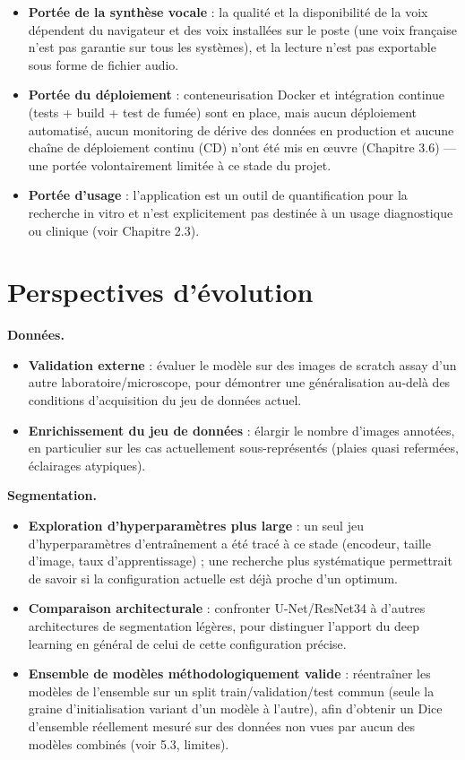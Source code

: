\documentclass[12pt,a4paper]{report}
\begin{document}
\begin{itemize}
\item \textbf{Portée de la synthèse vocale} : la qualité et la disponibilité de la voix dépendent du navigateur et des voix installées sur le poste (une voix française n'est pas garantie sur tous les systèmes), et la lecture n'est pas exportable sous forme de fichier audio.
\item \textbf{Portée du déploiement} : conteneurisation Docker et intégration continue (tests + build + test de fumée) sont en place, mais aucun déploiement automatisé, aucun monitoring de dérive des données en production et aucune chaîne de déploiement continu (CD) n'ont été mis en œuvre (Chapitre 3.6) --- une portée volontairement limitée à ce stade du projet.
\item \textbf{Portée d'usage} : l'application est un outil de quantification pour la recherche in vitro et n'est explicitement pas destinée à un usage diagnostique ou clinique (voir Chapitre 2.3).
\end{itemize}

\section{Perspectives d'évolution}

\textbf{Données.}
\begin{itemize}
\item \textbf{Validation externe} : évaluer le modèle sur des images de scratch assay d'un autre laboratoire/microscope, pour démontrer une généralisation au-delà des conditions d'acquisition du jeu de données actuel.
\item \textbf{Enrichissement du jeu de données} : élargir le nombre d'images annotées, en particulier sur les cas actuellement sous-représentés (plaies quasi refermées, éclairages atypiques).
\end{itemize}

\textbf{Segmentation.}
\begin{itemize}
\item \textbf{Exploration d'hyperparamètres plus large} : un seul jeu d'hyperparamètres d'entraînement a été tracé à ce stade (encodeur, taille d'image, taux d'apprentissage) ; une recherche plus systématique permettrait de savoir si la configuration actuelle est déjà proche d'un optimum.
\item \textbf{Comparaison architecturale} : confronter U-Net/ResNet34 à d'autres architectures de segmentation légères, pour distinguer l'apport du deep learning en général de celui de cette configuration précise.
\item \textbf{Ensemble de modèles méthodologiquement valide} : réentraîner les modèles de l'ensemble sur un split train/validation/test commun (seule la graine d'initialisation variant d'un modèle à l'autre), afin d'obtenir un Dice d'ensemble réellement mesuré sur des données non vues par aucun des modèles combinés (voir 5.3, limites).
\end{itemize}
\end{document}
